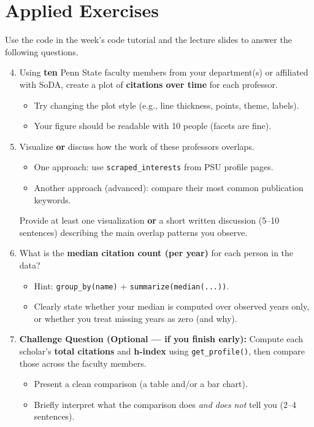 \documentclass[11pt]{article}
\begin{document}
\section*{Applied Exercises}
Use the code in the week's code tutorial and the lecture slides to answer the following questions.\bigskip

  \begin{enumerate}
\setcounter{enumi}{3}

\item Using \textbf{ten} Penn State faculty members from your department(s) or affiliated with SoDA, create a plot of \textbf{citations over time} for each professor.
\begin{itemize}
  \item Try changing the plot style (e.g., line thickness, points, theme, labels).
  \item Your figure should be readable with 10 people (facets are fine).
\end{itemize}

\item Visualize \textbf{or} discuss how the work of these professors overlaps.
\begin{itemize}
  \item One approach: use \texttt{scraped\_interests} from PSU profile pages.
  \item Another approach (advanced): compare their most common publication keywords.
\end{itemize}
\noindent Provide at least one visualization \textbf{or} a short written discussion (5--10 sentences) describing the main overlap patterns you observe.

\item What is the \textbf{median citation count (per year)} for each person in the data?
\begin{itemize}
  \item Hint: \texttt{group\_by(name)} + \texttt{summarize(median(...))}.
  \item Clearly state whether your median is computed over observed years only, or whether you treat missing years as zero (and why).
\end{itemize}

\item \textbf{Challenge Question (Optional --- if you finish early):}
Compute each scholar's \textbf{total citations} and \textbf{h-index} using \texttt{get\_profile()}, then compare those across the faculty members.
\begin{itemize}
  \item Present a clean comparison (a table and/or a bar chart).
  \item Briefly interpret what the comparison does \emph{and does not} tell you (2--4 sentences).
\end{itemize}

\end{enumerate}
\end{document}
